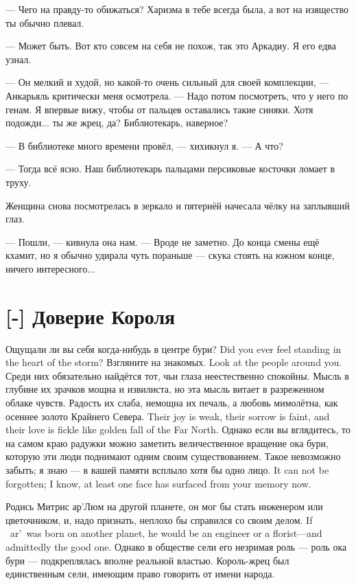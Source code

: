 --- Чего на правду-то обижаться?
Харизма в тебе всегда была, а вот на изящество ты обычно плевал.

--- Может быть.
Вот кто совсем на себя не похож, так это Аркадиу.
Я его едва узнал.

--- Он мелкий и худой, но какой-то очень сильный для своей комплекции, --- Анкарьяль критически меня осмотрела.
--- Надо потом посмотреть, что у него по генам.
Я впервые вижу, чтобы от пальцев оставались такие синяки.
Хотя подожди... ты же жрец, да?
Библиотекарь, наверное?

--- В библиотеке много времени провёл, --- хихикнул я.
--- А что?

--- Тогда всё ясно.
Наш библиотекарь пальцами персиковые косточки ломает в труху.

Женщина снова посмотрелась в зеркало и пятернёй начесала чёлку на заплывший глаз.

--- Пошли, --- кивнула она нам.
--- Вроде не заметно.
До конца смены ещё кхамит, но я обычно удирала чуть пораньше --- скука стоять на южном конце, ничего интересного...

\section{[-] Доверие Короля}

{Ощущали ли вы себя когда-нибудь в центре бури?}
{Did you ever feel standing in the heart of the storm?}
{Взгляните на знакомых.}
{Look at the people around you.}
Среди них обязательно найдётся тот, чьи глаза неестественно спокойны.
Мысль в глубине их зрачков мощна и извилиста, но эта мысль витает в разреженном облаке чувств.
{Радость их слаба, немощна их печаль, а любовь мимолётна, как осеннее золото Крайнего Севера.}
{Their joy is weak, their sorrow is faint, and their love is fickle like golden fall of the Far North.}
Однако если вы вглядитесь, то на самом краю радужки можно заметить величественное вращение ока бури, которую эти люди поднимают одним своим существованием.
{Такое невозможно забыть; я знаю --- в вашей памяти всплыло хотя бы одно лицо.}
{It can not be forgotten; I know, at least one face has surfaced from your memory now.}

{Родись Митрис ар'Люм на другой планете, он мог бы стать инженером или цветочником, и, надо признать, неплохо бы справился со своим делом.}
{If \Mitris\ ar'\Loem\ was born on another planet, he would be an engineer or a florist---and admittedly the good one.}
Однако в обществе сели его незримая роль --- роль ока бури --- подкреплялась вполне реальной властью.
Король-жрец был единственным сели, имеющим право говорить от имени народа.

